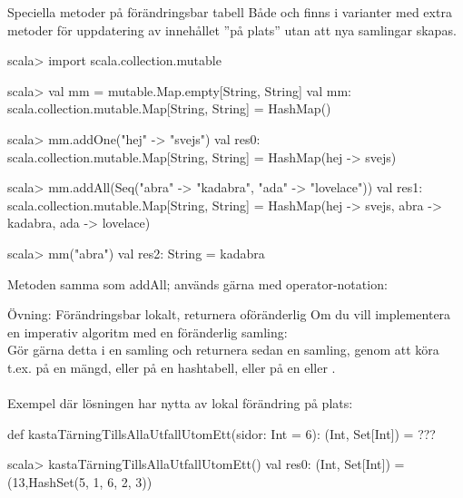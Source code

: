 \begin{Slide}{Speciella metoder på förändringsbar tabell}\SlideFontSmall
Både  och  finns i  varianter med extra metoder för uppdatering av innehållet ''på plats'' utan att nya samlingar skapas.
\begin{REPLsmall}
scala> import scala.collection.mutable

scala> val mm = mutable.Map.empty[String, String]
val mm: scala.collection.mutable.Map[String, String] = HashMap()

scala> mm.addOne("hej" -> "svejs")
val res0: scala.collection.mutable.Map[String, String] = 
  HashMap(hej -> svejs)

scala> mm.addAll(Seq("abra" -> "kadabra", "ada" -> "lovelace"))
val res1: scala.collection.mutable.Map[String, String] = 
  HashMap(hej -> svejs, abra -> kadabra, ada -> lovelace)

scala> mm("abra")
val res2: String = kadabra
\end{REPLsmall}
Metoden \code{++=} samma som addAll; används gärna med operator-notation:\\
\end{Slide}
  




\begin{Slide}{Övning: Förändringsbar lokalt, returnera oföränderlig}
\SlideFontSmall
Om du vill implementera en imperativ algoritm med en föränderlig samling:\\
Gör gärna detta  i en  samling och returnera sedan en  samling, genom att köra t.ex.  på en mängd, eller  på en hashtabell, eller  på en  eller .\\~\\
Exempel där lösningen har nytta av lokal förändring på plats:
\begin{Code}
def kastaTärningTillsAllaUtfallUtomEtt(sidor: Int = 6): (Int, Set[Int]) = ???
\end{Code}
\begin{REPL}
scala> kastaTärningTillsAllaUtfallUtomEtt()
val res0: (Int, Set[Int]) = (13,HashSet(5, 1, 6, 2, 3))
\end{REPL}
\end{Slide}


